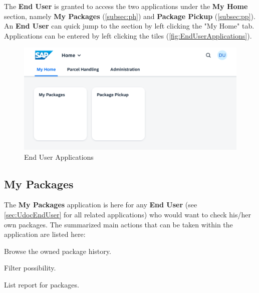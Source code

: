 The \textbf{End User} is granted to access the two applications under the \textbf{My Home} section, namely \textbf{My Packages} (\autoref{subsec:ph}) and \textbf{Package Pickup} (\autoref{subsec:pp}). An \textbf{End User} can quick jump to the section by left clicking the "My Home" tab. Applications can be entered by left clicking the tiles (\autoref{fig:EndUserApplications}).

\begin{figure}[H]
	\centering
	\includegraphics[width=1\linewidth]{images/user_doc/overviews/MyHomeTab.png}
	\caption{End User Applications}
	\label{fig:EndUserApplications}
\end{figure}


% 

\subsection{My Packages}
\label{subsec:ph}

The \textbf{My Packages} application is here for any \textbf{End User} (see \autoref{sec:UdocEndUser} for all related applications) who would want to check his/her own packages. 
The summarized main actions that can be taken within the application are listed here:

\begin{compactenum}
	\item Browse the owned package history.
        \begin{compactenum}
        	\item Filter possibility.
            \item List report for packages.
        \end{compactenum}
\end{compactenum}

